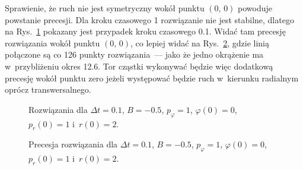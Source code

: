 \documentclass[a4paper; 12pt]{article}
\begin{document}
Sprawienie, że ruch nie jest symetryczny wokół punktu $(0,\,0)$ powoduje
powstanie precesji.
Dla kroku czasowego \num{1} rozwiązanie nie jest stabilne, dlatego na
Rys.~\ref{fig:data5} pokazany jest przypadek kroku czasowego \num{0.1}.
Widać tam precesję rozwiązania wokół punktu $(0,\,0)$, co lepiej widać na
Rys.~\ref{fig:data51}, gdzie linią połączone są co 126 punkty rozwiązania~---
jako że jedno okrążenie ma w~przybliżeniu okres \num{12.6}.
Tor cząstki wykonywać będzie więc dodatkową precesję wokół punktu zero jeżeli
występować będzie ruch w~kierunku radialnym oprócz transwersalnego.
\begin{figure}
    \centering
    \caption{Rozwiązania dla $\Delta t=\num{0.1}$, $B=\num{-0.5}$,
        $p_\varphi=\num{1}$, $\varphi(0)=\num{0}$, $p_r(0)=\num{1}$
        i~$r(0)=\num{2}$.}
    \label{fig:data5}
\end{figure}
\begin{figure}
    \centering
    \caption{Precesja rozwiązania dla $\Delta t=\num{0.1}$, $B=\num{-0.5}$,
        $p_\varphi=\num{1}$, $\varphi(0)=\num{0}$, $p_r(0)=\num{1}$
        i~$r(0)=\num{2}$.}
    \label{fig:data51}
\end{figure}
\end{document}
